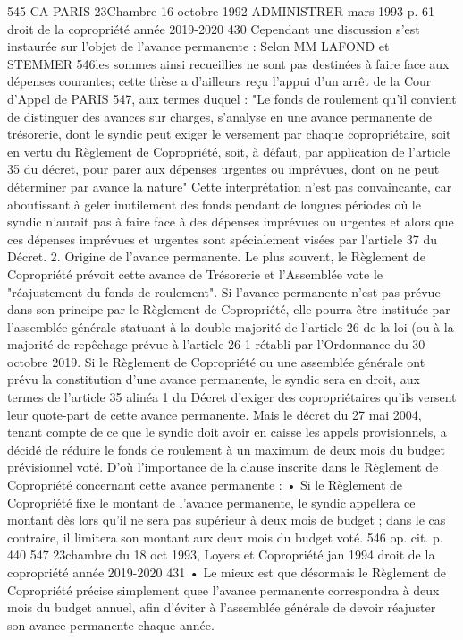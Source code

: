 545 CA PARIS 23\degres Chambre 16 octobre 1992 ADMINISTRER mars 1993 p. 61
droit de la copropriété année 2019-2020
430
Cependant une discussion s'est instaurée sur l'objet de l'avance permanente : Selon MM LAFOND et STEMMER 546les sommes ainsi recueillies ne sont pas destinées à faire face aux dépenses courantes; cette thèse a d'ailleurs reçu l'appui d'un arrêt de la Cour d’Appel de PARIS 547, aux termes duquel :
"Le fonds de roulement qu'il convient de distinguer des avances sur charges, s'analyse en une avance permanente de trésorerie, dont le syndic peut exiger le versement par chaque copropriétaire, soit en vertu du Règlement de Copropriété, soit, à défaut, par application de l'article 35 du décret, pour parer aux dépenses urgentes ou imprévues, dont on ne peut déterminer par avance la nature"
Cette interprétation n'est pas convaincante, car aboutissant à geler inutilement des fonds pendant de longues périodes où le syndic n'aurait pas à faire face à des dépenses imprévues ou urgentes et alors que ces dépenses imprévues et urgentes sont spécialement visées par l'article 37 du Décret.
2. Origine de l’avance permanente.
Le plus souvent, le Règlement de Copropriété prévoit cette avance de Trésorerie et l'Assemblée vote le "réajustement du fonds de roulement".
Si l’avance permanente n’est pas prévue dans son principe par le Règlement de Copropriété, elle pourra être instituée par l'assemblée générale statuant à la double majorité de l’article 26 de la loi (ou à la majorité de repêchage prévue à l’article 26-1 rétabli par l’Ordonnance du 30 octobre 2019.
Si le Règlement de Copropriété ou une assemblée générale ont prévu la constitution d’une avance permanente, le syndic sera en droit, aux termes de l'article 35 alinéa 1 du Décret d'exiger des copropriétaires qu’ils versent leur quote-part de cette avance permanente.
Mais le décret du 27 mai 2004, tenant compte de ce que le syndic doit avoir en caisse les appels provisionnels, a décidé de réduire le fonds de roulement à un maximum de deux mois du budget prévisionnel voté.
D’où l’importance de la clause inscrite dans le Règlement de Copropriété concernant cette avance permanente :
• Si le Règlement de Copropriété fixe le montant de l’avance permanente, le syndic appellera ce montant dès lors qu’il ne sera pas supérieur à deux mois de budget ; dans le cas contraire, il limitera son montant aux deux mois du budget voté.
546 op. cit. p. 440
547 23\degres chambre du 18 oct 1993, Loyers et Copropriété jan 1994 
droit de la copropriété année 2019-2020
431
• Le mieux est que désormais le Règlement de Copropriété précise simplement quee l’avance permanente correspondra à deux mois du budget annuel, afin d’éviter à l’assemblée générale de devoir réajuster son avance permanente chaque année.
